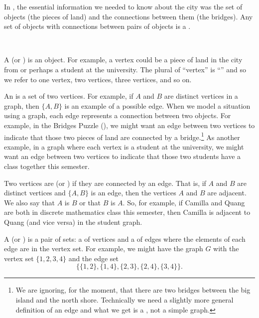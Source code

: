 In , the essential information we needed to know about the city was the set of objects (the pieces of land) and the connections between them (the bridges).
Any set of objects with connections between pairs of objects is a . 

\begin{defn}[Graph]
\label{defn_graph} 
~
    \begin{apart}       
        \item A  (or ) is an object.  For example, a vertex could be a piece of land in the city from  or perhaps a student at the university.  The plural of ``vertex'' is ``'' and so we refer to one vertex, two vertices, three vertices, and so on. 
        
        \item An  is a set of two vertices.  For example, if $A$ and $B$ are distinct vertices in a graph, then $\{A,B\}$ is an example of a possible edge.  When we model a situation using a graph, each edge represents a connection between two objects. For example, in the Bridges Puzzle (), we might want an edge between two vertices to indicate that those two pieces of land are connected by a bridge.\footnote{We are ignoring, for the moment, that there are two bridges between the big island and the north shore.  Technically we need a slightly more general definition of an edge and what we get is a , not a simple graph.} As another example, in a graph where each vertex is a student at the university, we might want an edge between two vertices to indicate that those two students have a class together this semester.  

        \item Two vertices are  (or ) if they are connected by an edge.  That is, if $A$ and $B$ are distinct vertices and $\{A,B\}$ is an edge, then the vertices $A$ and $B$ are adjacent.  We also say that $A$ is  $B$ or that $B$ is  $A$. So, for example, if Camilla and Quang are both in discrete mathematics class this semester, then Camilla is adjacent to Quang (and vice versa) in the student graph.
        
        \item \label{part_defn_graph} A  (or ) is a pair of sets: a  of vertices and a  of edges where the elements of each edge are in the vertex set.  For example, we might have the graph $G$ with the vertex set $\{1,2,3,4\}$ and the edge set $$\{\{1,2\},\{1,4\},\{2,3\},\{2,4\},\{3,4\}\}.$$
        

\end{apart}
\end{defn}
